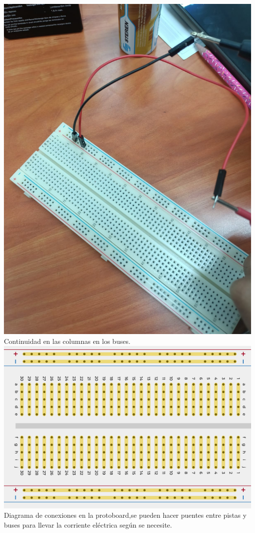\documentclass[10pt]{article}
\begin{document}
\begin{multicols}{2}
\begin{center}
	\includegraphics[scale = 0.1]{Imagenes/Fotos/ConColumnas.jpeg}\\
	Continuidad en las columnas en los buses.\\
	\includegraphics[scale = 0.4]{Imagenes/Fotos/Diagrama.png}\\
	Diagrama de conexiones en la protoboard,se pueden hacer puentes entre pistas y buses para llevar la corriente eléctrica según se necesite.
\end{center}


\end{multicols}
\end{document}
